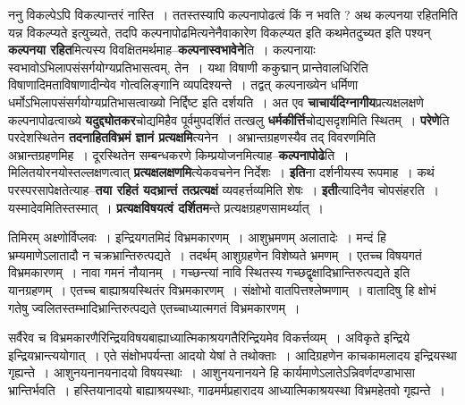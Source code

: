 \documentclass[article,12pt,a4paper]{memoir}
\begin{document}
	  \pstart ननु विकल्पेऽपि विकल्पान्तरं नास्ति । ततस्तस्यापि कल्पनापोढत्वं किं न भवति ? अथ कल्पनया रहितमिति यन्न विकल्प्यते इत्युच्यते, तदपि कल्पनापोढमित्यनेनैवाकारेण विकल्प्यत इति कथमेतदुच्यत इति पश्यन् \textbf{कल्पनया रहित}मित्यस्य विवक्षितमर्थमाह--\textbf{कल्पनास्वभावेने}ति । कल्पनायाः स्वभावोऽभिलापसंसर्गयोग्यप्रतिभासत्वम्, तेन । यथा विषाणी ककुद्मान् प्रान्तेवालधिरिति विषाणादिमताविषाणादीन्येव गोत्वलिङ्गानि व्यपदिश्यन्ते । तद्वत् कल्पनाख्येन धर्मिणा धर्मोऽभिलापसंसर्गयोग्यप्रतिभासत्वाख्यो निर्द्दिष्ट इति दर्शयति । अत एव \textbf{चाचार्यदिग्नागीय}प्रत्यक्षलक्षणे कल्पनापोढत्वाख्ये \textbf{यदुद्द्योतकर}चोद्यमिहैव पूर्वमुपदर्शितं तत्खलु \textbf{धर्मकीर्त्ति}चोद्यसदृशमिति स्थितम् । \textbf{परेणे}ति परदेशस्थितेन \textbf{तदनाहितविभ्रमं ज्ञानं प्रत्यक्षमि}त्यनेन । अभ्रान्तग्रहणस्यैव तद् विवरणमिति अभ्रान्तग्रहणमिह । दूरस्थितेन सम्बन्धकरणे किम्प्रयोजनमित्याह--\textbf{कल्पनापोढे}ति । मिलितयोरनयोस्तल्लक्षणत्वात् \textbf{प्रत्यक्षलक्षणमि}त्येकवचनेन निर्देशः । \textbf{इति}ना दर्शनीयस्य रूपमाह । कथं परस्परसापेक्षतेत्याह--\textbf{तया रहितं यदभ्रान्तं तत्प्रत्यक्षं} व्यवहर्त्तव्यमिति शेषः । \textbf{इती}त्यादिनैव चोपसंहरति । यस्मादेवमितिस्तस्मात् । \textbf{प्रत्यक्षविषयत्वं दर्शितम}न्ते प्रत्यक्षग्रहणसामर्थ्यात् ।
	\pend
	  \bigskip
	  \begingroup
	

	  \pstart तिमिरम् अक्ष्णोर्विप्लवः । इन्द्रियगतमिदं विभ्रमकारणम् । आशुभ्रमणम् अलातादेः । मन्दं हि भ्रम्यमाणेऽलातादौ न चक्रभ्रान्तिरुत्पद्यते । तदर्थम् आशुग्रहणेन विशेष्यते भ्रमणम् । एतच्च विषयगतं विभ्रमकारणम् । नावा गमनं नौयानम् । गच्छन्त्यां नावि स्थितस्य गच्छद्वृक्षादिभ्रान्तिरुत्पद्यते इति यानग्रहणम् । एतच्च बाह्याश्रयस्थितंर विभ्रमकारणम् । संक्षोभो वातपित्तश्लेष्मणाम् । वातादिषु हि क्षोभं गतेषु ज्वलितस्तम्भादिभ्रान्तिरुत्पद्यते एतच्चाध्यात्मगतं विभ्रमकारणम् ।
	\pend
        

	  \pstart सर्वैरेव च विभ्रमकारणैरिन्द्रियविषयबाह्याध्यात्मिकाश्रयगतैरिन्द्रियमेव विकर्त्तव्यम् । अविकृते इन्द्रिये इन्द्रियभ्रान्त्ययोगात् । एते संक्षोभपर्यन्ता आदयो येषां ते तथोक्ताः । आदिग्रहणेन काचकामलादय इन्द्रियस्था गृह्यन्ते । आशुनयनानयनादयो विषयस्थाः । आशुनयनानयने हि कार्यमाणेऽलातेऽन्निवर्णदण्डाभासा भ्रान्तिर्भवति । हस्तियानादयो बाह्याश्रयस्थाः, गाढमर्मप्रहारादय आध्यात्मिकाश्रयस्था विभ्रमहेतवो गृह्यन्ते ।
	\pend
        
\end{document}
